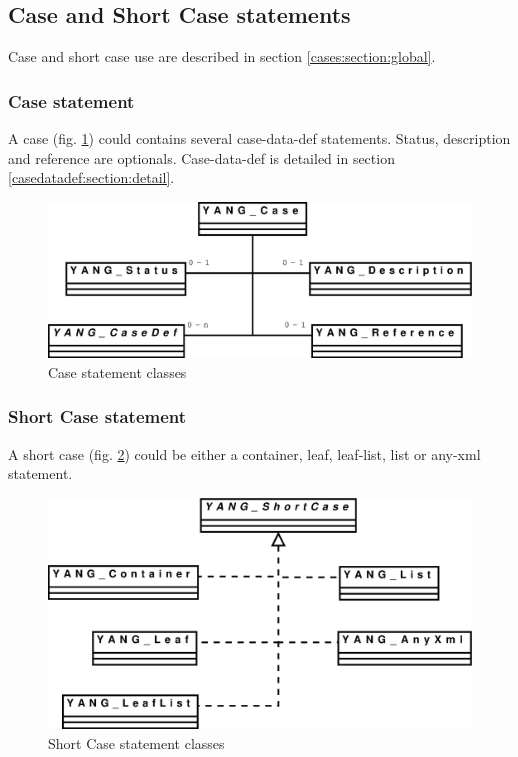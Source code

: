 \documentclass[a4paper]{article}
\begin{document}
\subsection{Case and Short Case statements}
\label{cases:section:detail}

Case and short case use are described in section \ref{cases:section:global}.

\subsubsection{Case statement}
\label{casedatadef:section:global}

A  case  (fig.    \ref{case})  could  contains  several  case-data-def
statements.     Status,      description     and     reference     are
optionals.      Case-data-def     is      detailed      in     section
\ref{casedatadef:section:detail}.
\begin{figure}[htbp]
\begin{center}
\includegraphics[scale = .3]{case.eps}
\end{center}
\caption{Case statement classes}
\label{case}
\end{figure}

\subsubsection{Short Case statement}
A short case (fig. \ref{shortcase}) could be either a container, leaf,
leaf-list, list or any-xml statement.
\begin{figure}[htbp]
\begin{center}
\includegraphics[scale = .3]{shortcase.eps}
\end{center}
\caption{Short Case statement classes}
\label{shortcase}
\end{figure}
\end{document}
